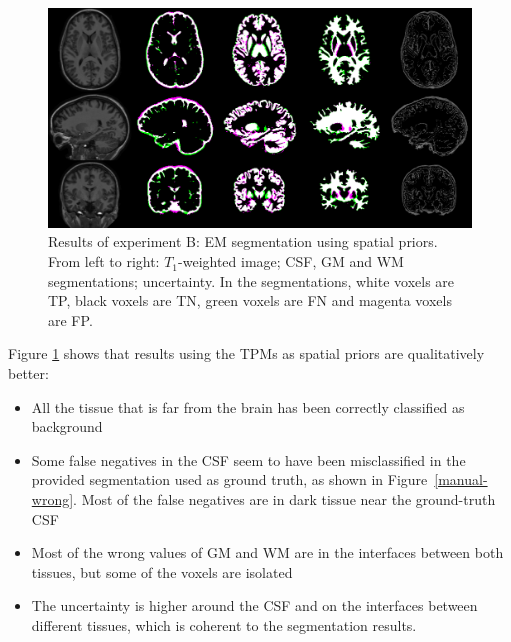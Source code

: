 \begin{figure}
  \centering
  \includegraphics[width=\textwidth]{figures/experiment_b}
  \caption{Results of experiment B: EM segmentation using spatial priors. From left to right: $T_1$-weighted image; CSF, GM and WM segmentations; uncertainty. In the segmentations, white voxels are TP, black voxels are TN, green voxels are FN and magenta voxels are FP.}
  \label{fig:experiment-b}
\end{figure}

Figure \ref{fig:experiment-b} shows that results using the TPMs as spatial priors are qualitatively better:
\begin{itemize}
  \item All the tissue that is far from the brain has been correctly classified as background
  \item Some false negatives in the CSF seem to have been misclassified in the provided segmentation used as ground truth, as shown in Figure~\ref{manual-wrong}. Most of the false negatives are in dark tissue near the ground-truth CSF
  \item Most of the wrong values of GM and WM are in the interfaces between both tissues, but some of the voxels are isolated
  \item The uncertainty is higher around the CSF and on the interfaces between different tissues, which is coherent to the segmentation results.
\end{itemize}


